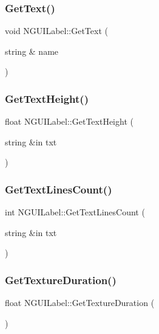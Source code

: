 \subsubsection{\texorpdfstring{Get\+Text()}{GetText()}}
{\footnotesize\ttfamily void N\+G\+U\+I\+Label\+::\+Get\+Text (\begin{DoxyParamCaption}\item[{string \&}]{name }\end{DoxyParamCaption})}

\hypertarget{class_n_g_u_i_label_a127aba476903cc5416eecf89805a2df9}{}\label{class_n_g_u_i_label_a127aba476903cc5416eecf89805a2df9} 
\subsubsection{\texorpdfstring{Get\+Text\+Height()}{GetTextHeight()}}
{\footnotesize\ttfamily float N\+G\+U\+I\+Label\+::\+Get\+Text\+Height (\begin{DoxyParamCaption}\item[{string \&in}]{txt }\end{DoxyParamCaption})}

\hypertarget{class_n_g_u_i_label_a129b4dd6356803814ab41fdfb04b9d94}{}\label{class_n_g_u_i_label_a129b4dd6356803814ab41fdfb04b9d94} 
\subsubsection{\texorpdfstring{Get\+Text\+Lines\+Count()}{GetTextLinesCount()}}
{\footnotesize\ttfamily int N\+G\+U\+I\+Label\+::\+Get\+Text\+Lines\+Count (\begin{DoxyParamCaption}\item[{string \&in}]{txt }\end{DoxyParamCaption})}

\hypertarget{class_n_g_u_i_label_af07793e84af671fa19e5826063984101}{}\label{class_n_g_u_i_label_af07793e84af671fa19e5826063984101} 
\subsubsection{\texorpdfstring{Get\+Texture\+Duration()}{GetTextureDuration()}}
{\footnotesize\ttfamily float N\+G\+U\+I\+Label\+::\+Get\+Texture\+Duration (\begin{DoxyParamCaption}{ }\end{DoxyParamCaption})}

